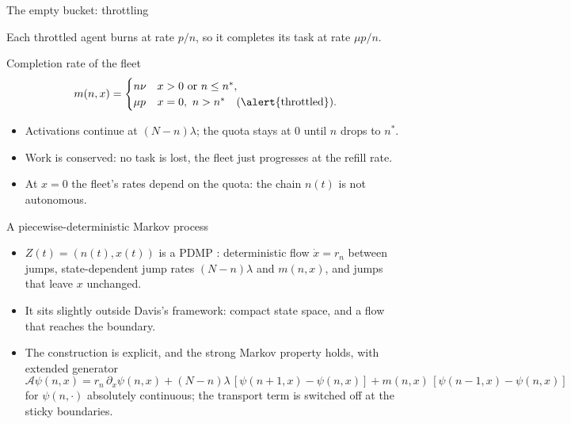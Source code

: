\documentclass[aspectratio=169]{beamer}
\renewcommand{\cite}{\citep}
\newcommand{\ns}{n^*}
\newenvironment*{myitem}[1][1.5em]{\begin{itemize}\setlength{\itemsep}{#1}}{\end{itemize}}
\begin{document}
\begin{frame}{The empty bucket: throttling}

	Each throttled agent burns at rate $p/n$, so it completes its task at rate $\mu p/n$.

	\medskip
	\pause

	\begin{block}{Completion rate of the fleet}
		\begin{equation*}
			m(n,x) = \begin{cases} n\nu & x>0 \text{ or } n\leq\ns,\\ \mu p & x=0,\ n>\ns \quad\text{(\alert{throttled})}.\end{cases}
		\end{equation*}
	\end{block}

	\medskip

	\begin{myitem}[1em]
		\item Activations continue at $(N-n)\lambda$; the quota stays at $0$ until $n$ drops to $\ns$.
		\item Work is \alert{conserved}: no task is lost, the fleet just progresses at the refill rate.
		\item At $x=0$ the fleet's rates depend on the quota: the chain $n(t)$ is \alert{not autonomous}.
	\end{myitem}
\end{frame}

\begin{frame}{A piecewise-deterministic Markov process}

	\begin{myitem}[0.9em]
		\item $Z(t)=(n(t),x(t))$ is a PDMP \cite{Davis1984,Davis1993}: deterministic flow $\dot x = r_n$ between jumps, state-dependent jump rates $(N-n)\lambda$ and $m(n,x)$, and jumps that leave $x$ unchanged.
		\item It sits slightly outside Davis's framework: \alert{compact} state space, and a flow that \alert{reaches} the boundary.
		\item The construction is explicit, and the strong Markov property holds, with \alert{extended generator}
		{\small
		\begin{equation*}
			\mathcal{A}\psi(n,x) = r_n\,\partial_x\psi(n,x) + (N-n)\lambda\,[\psi(n{+}1,x)-\psi(n,x)] + m(n,x)\,[\psi(n{-}1,x)-\psi(n,x)]
		\end{equation*}}
		for $\psi(n,\cdot)$ absolutely continuous; the transport term is switched off at the sticky boundaries.
	\end{myitem}
\end{frame}
\end{document}
